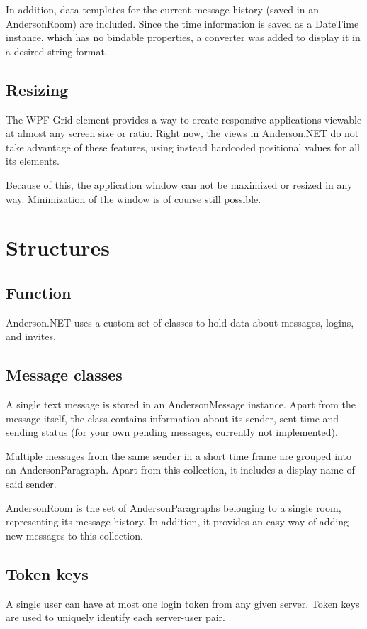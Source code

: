 \documentclass[titlepage]{scrartcl}
\begin{document}
In addition, data templates for the current message history (saved in an AndersonRoom) are included. Since the time information is saved as a DateTime instance, which has no bindable properties, a converter was added to display it in a desired string format.

\subsection{Resizing}
The WPF Grid element provides a way to create responsive applications viewable at almost any screen size or ratio. Right now, the views in Anderson.NET do not take advantage of these features, using instead hardcoded positional values for all its elements.

Because of this, the application window can not be maximized or resized in any way. Minimization of the window is of course still possible.

\section{Structures}
\subsection{Function}
Anderson.NET uses a custom set of classes to hold data about messages, logins, and invites.

\subsection{Message classes}
A single text message is stored in an AndersonMessage instance. Apart from the message itself, the class contains information about its sender, sent time and sending status (for your own pending messages, currently not implemented). 

Multiple messages from the same sender in a short time frame are grouped into an AndersonParagraph. Apart from this collection, it includes a display name of said sender.

AndersonRoom is the set of AndersonParagraphs belonging to a single room, representing its message history. In addition, it provides an easy way of adding new messages to this collection.

\subsection{Token keys}
A single user can have at most one login token from any given server. Token keys are used to uniquely identify each server-user pair.
\end{document}
